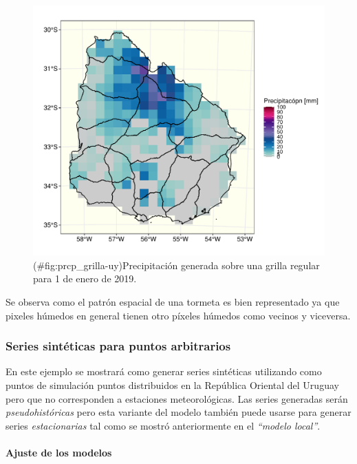 \documentclass[
  12pt]{article}
\begin{document}
\begin{figure}
\centering
\includegraphics{Manual_Generador_files/figure-latex/prcp_grilla-uy-1.pdf}
\caption{(\#fig:prcp\_grilla-uy)Precipitación generada sobre una grilla regular para 1 de enero de 2019.}
\end{figure}

Se observa como el patrón espacial de una tormeta es bien representado ya que pixeles húmedos en general tienen otro píxeles húmedos como vecinos y viceversa.

\hypertarget{series-sintuxe9ticas-para-puntos-arbitrarios}{%
\subsubsection{Series sintéticas para puntos arbitrarios}\label{series-sintuxe9ticas-para-puntos-arbitrarios}}

En este ejemplo se mostrará como generar series sintéticas utilizando como puntos de simulación puntos distribuidos en la República Oriental del Uruguay pero que no corresponden a estaciones meteorológicas. Las series generadas serán \emph{pseudohistóricas} pero esta variante del modelo también puede usarse para generar series \emph{estacionarias} tal como se mostró anteriormente en el \emph{``modelo local''}.

\hypertarget{ajuste-de-los-modelos-4}{%
\paragraph{Ajuste de los modelos}\label{ajuste-de-los-modelos-4}}
\end{document}
